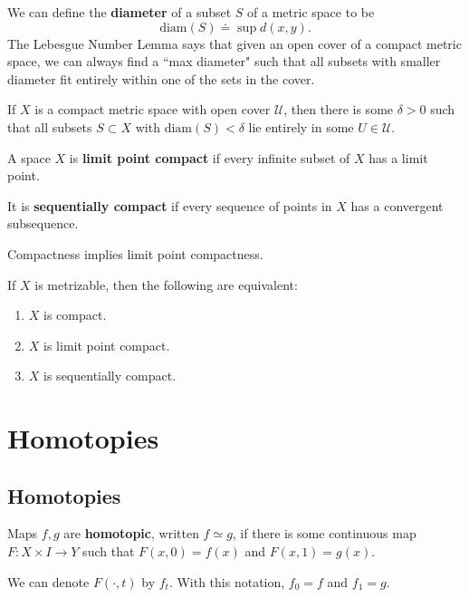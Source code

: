 \documentclass[twoside,10pt]{report}
\begin{document}
We can define the \textbf{diameter} of a subset $S$ of a metric space to be
\[
	\text{diam}(S) \doteq \sup d(x,y).
\] The Lebesgue Number Lemma says that given an open cover of a compact metric space, we can always find a ``max diameter" such that all subsets with smaller diameter fit entirely within one of the sets in the cover.
\begin{thrm}
	If $X$ is a compact metric space with open cover $\mathcal{U}$, then there is some $\delta>0$ such that all subsets $S\subset X$ with $\text{diam}(S) < \delta$ lie entirely in some $U \in \mathcal{U}$.
\end{thrm}

\begin{defn}[]
A space $X$ is \textbf{limit point compact} if every infinite subset of $X$ has a limit point.

It is \textbf{sequentially compact} if every sequence of points in $X$ has a convergent subsequence.
\end{defn}

\begin{prop}
Compactness implies limit point compactness.
\end{prop}

\begin{thrm}[]
If $X$ is metrizable, then the following are equivalent:
\begin{enumerate}
	\item $X$ is compact.
	\item $X$ is limit point compact.
	\item $X$ is sequentially compact.
\end{enumerate}
\end{thrm}


\chapter{Homotopies}


\section{Homotopies}

\begin{defn}[]
	Maps $f,g$ are \textbf{homotopic}, written $f \simeq g$, if there is some continuous map $F:X\times I\to Y$ such that $F(x,0)=f(x)$ and $F(x,1)=g(x)$.
\end{defn}
We can denote $F(\cdot,t)$ by $f_{t}$. With this notation, $f_0=f$ and $f_1=g$.
\end{document}
